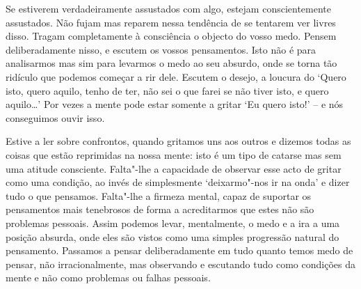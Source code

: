 Se estiverem verdadeiramente assustados com algo, estejam
conscientemente assustados. Não fujam mas reparem nessa tendência de se
tentarem ver livres disso. Tragam completamente à consciência o objecto
do vosso medo. Pensem deliberadamente nisso, e escutem os vossos
pensamentos. Isto não é para analisarmos mas sim para levarmos o medo ao
seu absurdo, onde se torna tão ridículo que podemos começar a rir dele.
Escutem o desejo, a loucura do `Quero isto, quero aquilo, tenho de ter,
não sei o que farei se não tiver isto, e quero aquilo\ldots{}' Por
vezes a mente pode estar somente a gritar `Eu quero isto!' -- e nós
conseguimos ouvir isso.

Estive a ler sobre confrontos, quando gritamos uns aos outros e dizemos
todas as coisas que estão reprimidas na nossa
mente: isto é um tipo de catarse mas sem uma atitude consciente.
Falta"-lhe a capacidade de observar esse acto de gritar como uma
condição, ao invés de simplesmente `deixarmo"-nos ir na onda' e dizer
tudo o que pensamos. Falta"-lhe a firmeza mental, capaz de suportar os
pensamentos mais tenebrosos de forma a acreditarmos que estes não são
problemas pessoais. Assim podemos levar, mentalmente, o medo e a ira a
uma posição absurda, onde eles são vistos como uma simples progressão
natural do pensamento. Passamos a pensar deliberadamente em tudo quanto
temos medo de pensar, não irracionalmente, mas observando e escutando
tudo como condições da mente e não como problemas ou falhas pessoais.

